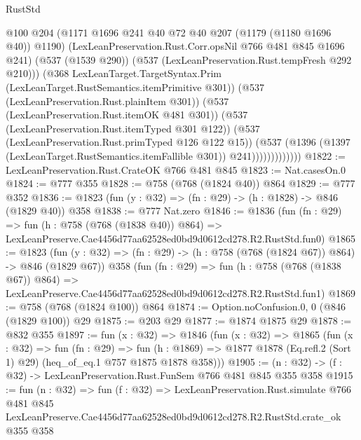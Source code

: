 \begin{lexlean}{RustStd}
\begin{coremodule}
                            @100
                            @204
                            (@1171 @1696 @241 @40 @72 @40 @207 (@1179 (@1180 @1696 @40)) @1190)
                            (LexLeanPreservation.Rust.Corr.opsNil @766 @481 @845 @1696 @241)
                            (@537 (@1539 @290))
                            (@537 (LexLeanPreservation.Rust.tempFresh @292 @210)))
                          (@368
                            LexLeanTarget.TargetSyntax.Prim
                            (LexLeanTarget.RustSemantics.itemPrimitive @301))
                          (@537 (LexLeanPreservation.Rust.plainItem @301))
                          (@537 (LexLeanPreservation.Rust.itemOK @481 @301))
                          (@537 (LexLeanPreservation.Rust.itemTyped @301 @122))
                          (@537 (LexLeanPreservation.Rust.primTyped @126 @122 @15))
                          (@537
                            (@1396
                              (@1397 (LexLeanTarget.RustSemantics.itemFallible @301))
                              @241)))))))))))))
@1822 := LexLeanPreservation.Rust.CrateOK @766 @481 @845
@1823 := Nat.casesOn.{0}
@1824 := @777 @355
@1828 := @758 (@768 (@1824 @40)) @864
@1829 := @777 @352
@1836 := @1823 (fun (y : @32) => (fn : @29) -> (h : @1828) -> @846 (@1829 @40)) @358
@1838 := @777 Nat.zero
@1846 := @1836
    (fun (fn : @29) =>
    fun (h : @758 (@768 (@1838 @40)) @864) =>
    LexLeanPreserve.Cae4456d77aa62528ed0bd9d0612cd278.R2.RustStd.fun0)
@1865 := @1823
    (fun (y : @32) => (fn : @29) -> (h : @758 (@768 (@1824 @67)) @864) -> @846 (@1829 @67))
    @358
    (fun (fn : @29) =>
    fun (h : @758 (@768 (@1838 @67)) @864) =>
    LexLeanPreserve.Cae4456d77aa62528ed0bd9d0612cd278.R2.RustStd.fun1)
@1869 := @758 (@768 (@1824 @100)) @864
@1874 := Option.noConfusion.{0, 0} (@846 (@1829 @100)) @29
@1875 := @203 @29
@1877 := @1874 @1875 @29
@1878 := @832 @355
@1897 := fun (x : @32) =>
  @1846
    (fun (x : @32) =>
    @1865
      (fun (x : @32) =>
      fun (fn : @29) =>
      fun (h : @1869) =>
      @1877 @1878 (Eq.refl.{2} (Sort 1) @29) (heq_of_eq.{1} @757 @1875 @1878 @358)))
@1905 := (n : @32) -> (f : @32) -> LexLeanPreservation.Rust.FunSem @766 @481 @845 @355 @358
@1915 := fun (n : @32) =>
  fun (f : @32) =>
  LexLeanPreservation.Rust.simulate
    @766
    @481
    @845
    LexLeanPreserve.Cae4456d77aa62528ed0bd9d0612cd278.R2.RustStd.crate_ok
    @355
    @358
\end{coremodule}
\end{lexlean}
